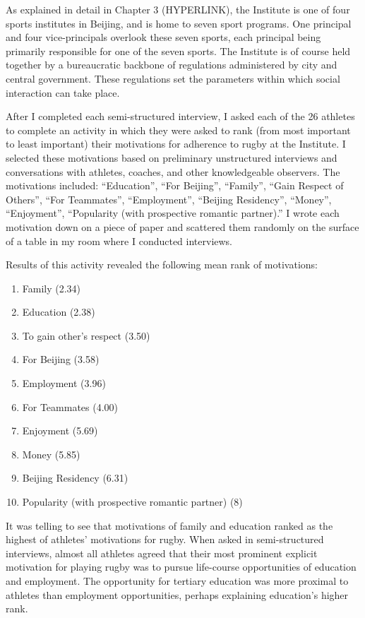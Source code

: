 \begin{CJK}{UTF8}{gbsn}
  As explained in detail in Chapter 3 (HYPERLINK), the Institute is one
  of four sports institutes in Beijing, and is home to seven sport programs.  One principal and four vice-principals overlook these seven sports, each principal being primarily responsible for one of the seven sports.  The Institute is of course held together by a bureaucratic backbone of regulations administered by city and central government.  These regulations set the parameters within which social interaction can take place.

  After I completed each semi-structured interview, I asked each of the 26 athletes to complete an activity in which they were asked to rank (from most important to least important) their motivations for adherence to rugby at the Institute.  I selected these motivations based on preliminary unstructured interviews and conversations with athletes, coaches, and other knowledgeable observers.  The motivations included: ``Education'', ``For Beijing'', ``Family'', ``Gain Respect of Others'', ``For Teammates'', ``Employment'', ``Beijing Residency'', ``Money'', ``Enjoyment'', ``Popularity (with prospective romantic partner).'' I wrote each motivation down on a piece of paper and scattered them randomly on the surface of a table in my room where I conducted interviews.

  Results of this activity revealed the following mean rank of motivations:

  \begin{enumerate}
    \item Family (2.34)
    \item Education (2.38)
    \item To gain other's respect (3.50)
    \item For Beijing (3.58)
    \item Employment (3.96)
    \item For Teammates (4.00)
    \item Enjoyment (5.69)
    \item Money (5.85)
    \item Beijing Residency (6.31)
    \item Popularity (with prospective romantic partner) (8)
  \end{enumerate}

  It was telling to see that motivations of family and education ranked as the highest of athletes' motivations for rugby.  When asked in semi-structured interviews, almost all athletes agreed that their most prominent explicit motivation for playing rugby was to pursue life-course opportunities of education and employment. The opportunity for tertiary education was more proximal to athletes than employment opportunities, perhaps explaining education's higher rank.


\end{CJK}
